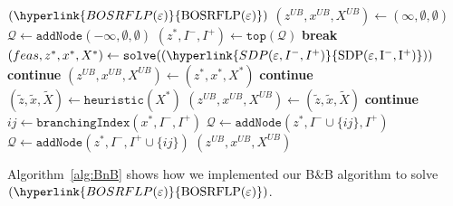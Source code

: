 \documentclass{article}
\newcommand{\myrefmath}[1]{(\hyperlink{#1}{\mathrm{#1}})}
\newcommand{\BB}{B\&B\xspace}
\begin{document}
\begin{algorithm}[tb]
    \caption{SDP-based \BB algorithm to solve $BOSRFLP(\varepsilon)$ for fixed $\varepsilon$}\label{alg:BnB}
\begin{algorithmic}[1]
    \Require $\myrefmath{BOSRFLP(\varepsilon)}$
    \State $(z^{UB},x^{UB},X^{UB}) \gets (\infty,\emptyset,\emptyset)$  
  \State $\mathcal{Q} \gets \texttt{addNode}( - \infty, \emptyset,\emptyset)$  \label{line:init}
        \State $(z^*, I^-,I^+) \gets \texttt{top}(\mathcal Q)$ \label{line:pickNode}
          \label{line:bound1}
            \State \textbf{break} \label{line:bound3}
        \EndIf
        \State $(feas,z^*,x^*,X^*)\gets \texttt{solve}(\myrefmath{SDP(\varepsilon,I^-,I^+)})$ \label{line:solve}
         
            \State \textbf{continue}
        \EndIf
          \label{line:integrality}
             
                \State $(z^{UB},x^{UB},X^{UB}) \gets (z^*,x^*,X^*)$
            \EndIf
            \State \textbf{continue}
        \EndIf
        \State $(\tilde z,\tilde x, \tilde X) \gets \texttt{heuristic}(X^*)$ 
         
            \State $(z^{UB},x^{UB},X^{UB}) \gets (\tilde z,\tilde x, \tilde X)$
        \EndIf
          \label{line:bound2}
            \State \textbf{continue}
        \EndIf
            \State $ij \gets \texttt{branchingIndex}(x^*,I^-,I^+)$  \label{line:branch1}
            \State $\mathcal Q \gets \texttt{addNode}(z^*,I^- \cup \{ij\},I^+)$  \label{line:branch2}
            \State $\mathcal Q \gets \texttt{addNode}(z^*,I^-,I^+\cup \{ij\})$  \label{line:branch3}
    \EndWhile
    \State \Return $(z^{UB},x^{UB},X^{UB})$
\end{algorithmic}
\end{algorithm}
Algorithm~\ref{alg:BnB} shows how we implemented our \BB algorithm to solve $\myrefmath{BOSRFLP(\varepsilon)}$.
\end{document}
